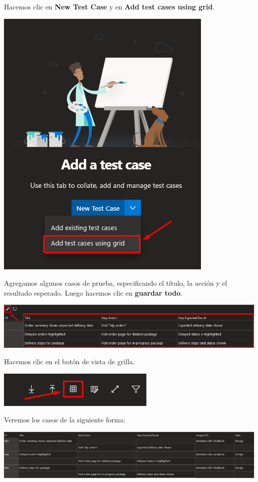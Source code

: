 \documentclass{elsarticle}
\begin{document}
Hacemos clic en \textbf{New Test Case} y en \textbf{Add test cases using grid}.
\begin{center}
	\includegraphics{img/Screenshot_52.png}
\end{center}

Agregamos algunos casos de prueba, especificando el título, la acción y el resultado esperado. Luego hacemos clic en \textbf{guardar todo}.
\begin{center}
	\includegraphics[width=\columnwidth]{img/Screenshot_54.png}
\end{center}

Hacemos clic en el botón de vista de grilla.
\begin{center}
	\includegraphics{img/Screenshot_60.png}
\end{center}

Veremos los casos de la siguiente forma:
\begin{center}
	\includegraphics[width=\columnwidth]{img/Screenshot_55.png}
\end{center}
\end{document}
